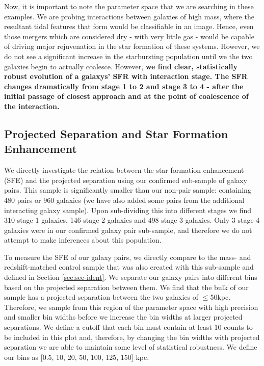 Now, it is important to note the parameter space that we are searching in these examples. We are probing interactions between galaxies of high mass, where the resultant tidal features that form would be classifiable in an image. Hence, even those mergers which are considered dry - with very little gas - would be capable of driving major rejuvenation in the star formation of these systems. However, we do not see a significant increase in the starbursting population until we the two galaxies begin to actually coalesce. However, \textbf{we find clear, statistically robust evolution of a galaxys' SFR with interaction stage. The SFR changes dramatically from stage 1 to 2 and stage 3 to 4 - after the initial passage of closest approach and at the point of coalescence of the interaction.}

\subsection{Projected Separation and Star Formation Enhancement}
\noindent We directly investigate the relation between the star formation enhancement (SFE) and the projected separation using our confirmed sub-sample of galaxy pairs. This sample is significantly smaller than our non-pair sample: containing 480 pairs or 960 galaxies (we have also added some pairs from the additional interacting galaxy sample). Upon sub-dividing this into different stages we find 310 stage 1 galaxies, 146 stage 2 galaxies and 498 stage 3 galaxies. Only 3 stage 4 galaxies were in our confirmed galaxy pair sub-sample, and therefore we do not attempt to make inferences about this population. 

To measure the SFE of our galaxy pairs, we directly compare to the mass- and redshift-matched control sample that was also created with this sub-sample and defined in Section \ref{sec:sec-ident}. We separate our galaxy pairs into different bins based on the projected separation between them. We find that the bulk of our sample has a projected separation between the two galaxies of $\leq$50kpc. Therefore, we sample from this region of the parameter space with high precision and smaller bin widths before we increase the bin widths at larger projected separations. We define a cutoff that each bin must contain at least 10 counts to be included in this plot and, therefore, by changing the bin widths with projected separation we are able to maintain some level of statistical robustness. We define our bins as [0.5, 10, 20, 50, 100, 125, 150] kpc.

